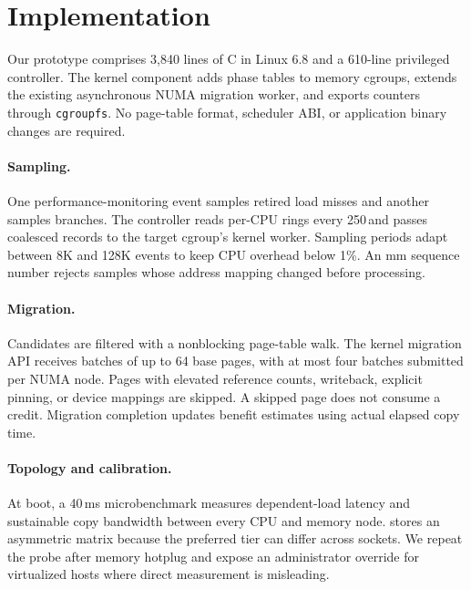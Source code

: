 \section{Implementation}
\label{sec:implementation}

Our prototype comprises 3,840 lines of C in Linux 6.8 and a 610-line privileged
controller.  The kernel component adds phase tables to memory cgroups, extends
the existing asynchronous NUMA migration worker, and exports counters through
\texttt{cgroupfs}.  No page-table format, scheduler ABI, or application binary
changes are required.

\paragraph{Sampling.}
One performance-monitoring event samples retired load misses and another
samples branches.  The controller reads per-CPU rings every 250\,\us and passes
coalesced records to the target cgroup's kernel worker.  Sampling periods adapt
between 8K and 128K events to keep CPU overhead below 1\%.  An mm sequence
number rejects samples whose address mapping changed before processing.

\paragraph{Migration.}
Candidates are filtered with a nonblocking page-table walk.  The kernel
migration API receives batches of up to 64 base pages, with at most four
batches submitted per NUMA node.  Pages with elevated reference counts,
writeback, explicit
pinning, or device mappings are skipped.  A skipped page does not consume a
credit.  Migration completion updates benefit estimates using actual elapsed
copy time.

\paragraph{Topology and calibration.}
At boot, a 40\,ms microbenchmark measures dependent-load latency and sustainable
copy bandwidth between every CPU and memory node.  \system stores an asymmetric
matrix because the preferred tier can differ across sockets.  We repeat the
probe after memory hotplug and expose an administrator override for virtualized
hosts where direct measurement is misleading.
